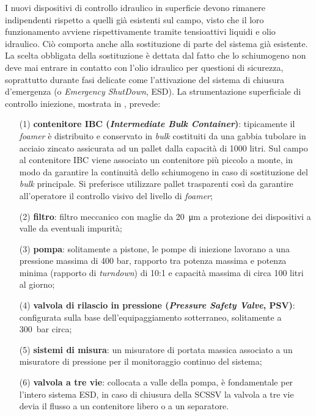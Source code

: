 I nuovi dispositivi di controllo idraulico in superficie devono rimanere indipendenti rispetto a quelli già esistenti sul campo, visto che il loro funzionamento avviene rispettivamente tramite tensioattivi liquidi e olio idraulico. Ciò comporta anche alla sostituzione di parte del sistema già esistente. La scelta obbligata della sostituzione è dettata dal fatto che lo schiumogeno non deve mai entrare in contatto con l'olio idraulico per questioni di sicurezza, soprattutto durante fasi delicate come l'attivazione del sistema di chiusura d'emergenza (o \textit{Emergency ShutDown}, ESD). La strumentazione superficiale di controllo iniezione, mostrata in , prevede:
\begin{itemize}
    \item[(1)] \textbf{contenitore IBC (\textit{Intermediate Bulk Container})}: tipicamente il \textit{foamer} è distribuito e conservato in \textit{bulk} costituiti da una gabbia tubolare in acciaio zincato assicurata ad un pallet dalla capacità di 1000 litri. Sul campo al contenitore IBC viene associato un contenitore più piccolo a monte, in modo da garantire la continuità dello schiumogeno in caso di sostituzione del \textit{bulk} principale. Si preferisce utilizzare pallet trasparenti così da garantire all'operatore il controllo visivo del livello di \textit{foamer};
    \item[(2)] \textbf{filtro}: filtro meccanico con maglie da \SI{20}{\um} a protezione dei dispositivi a valle da eventuali impurità;
    \item[(3)] \textbf{pompa}: solitamente a pistone, le pompe di iniezione lavorano a una pressione massima di 400 bar, rapporto tra potenza massima e potenza minima (rapporto di \textit{turndown}) di 10:1 e capacità massima di circa 100 litri al giorno;
    \item[(4)] \textbf{valvola di rilascio in pressione (\textit{Pressure Safety Valve}, PSV)}: configurata sulla base dell'equipaggiamento sotterraneo, solitamente a \SI{300}{bar} circa;
    \item[(5)] \textbf{sistemi di misura}: un misuratore di portata massica associato a un misuratore di pressione per il monitoraggio continuo del sistema;
    \item[(6)] \textbf{valvola a tre vie}: collocata a valle della pompa, è fondamentale per l'intero sistema ESD, in caso di chiusura della SCSSV la valvola a tre vie devia il flusso a un contenitore libero o a un separatore.
\end{itemize}

